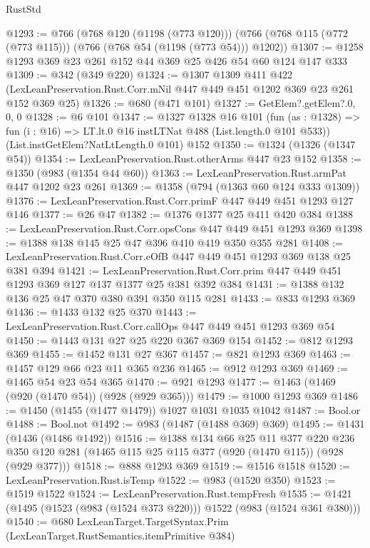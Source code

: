 \begin{lexlean}{RustStd}
\begin{coremodule}
@1293 := @766
    (@768 @120 (@1198 (@773 @120)))
    (@766 (@768 @115 (@772 (@773 @115))) (@766 (@768 @54 (@1198 (@773 @54))) @1202))
@1307 := @1258 @1293 @369 @23 @261 @152 @44 @369 @25 @426 @54 @60 @124 @147 @333
@1309 := @342 (@349 @220)
@1324 := @1307
    @1309
    @411
    @422
    (LexLeanPreservation.Rust.Corr.mNil @447 @449 @451 @1202 @369 @23 @261 @152 @369 @25)
@1326 := @680 (@471 @101)
@1327 := GetElem?.getElem?.{0, 0, 0}
@1328 := @6 @101
@1347 := @1327
    @1328
    @16
    @101
    (fun (as : @1328) => fun (i : @16) => LT.lt.{0} @16 instLTNat @488 (List.length.{0} @101 @533))
    (List.instGetElem?NatLtLength.{0} @101)
    @152
@1350 := @1324 (@1326 (@1347 @54))
@1354 := LexLeanPreservation.Rust.otherArms @447 @23 @152
@1358 := @1350 (@983 (@1354 @44 @60))
@1363 := LexLeanPreservation.Rust.armPat @447 @1202 @23 @261
@1369 := @1358 (@794 (@1363 @60 @124 @333 @1309))
@1376 := LexLeanPreservation.Rust.Corr.primF @447 @449 @451 @1293 @127 @146
@1377 := @26 @47
@1382 := @1376 @1377 @25 @411 @420 @384
@1388 := LexLeanPreservation.Rust.Corr.opsCons @447 @449 @451 @1293 @369
@1398 := @1388 @138 @145 @25 @47 @396 @410 @419 @350 @355 @281
@1408 := LexLeanPreservation.Rust.Corr.eOfB @447 @449 @451 @1293 @369 @138 @25 @381 @394
@1421 := LexLeanPreservation.Rust.Corr.prim
    @447
    @449
    @451
    @1293
    @369
    @127
    @137
    @1377
    @25
    @381
    @392
    @384
@1431 := @1388 @132 @136 @25 @47 @370 @380 @391 @350 @115 @281
@1433 := @833 @1293 @369
@1436 := @1433 @132 @25 @370
@1443 := LexLeanPreservation.Rust.Corr.callOps @447 @449 @451 @1293 @369 @54
@1450 := @1443 @131 @27 @25 @220 @367 @369 @154
@1452 := @812 @1293 @369
@1455 := @1452 @131 @27 @367
@1457 := @821 @1293 @369
@1463 := @1457 @129 @66 @23 @11 @365 @236
@1465 := @912 @1293 @369
@1469 := @1465 @54 @23 @54 @365
@1470 := @921 @1293
@1477 := @1463 (@1469 (@920 (@1470 @54)) (@928 (@929 @365)))
@1479 := @1000 @1293 @369
@1486 := @1450 (@1455 (@1477 @1479)) @1027 @1031 @1035 @1042
@1487 := Bool.or
@1488 := Bool.not
@1492 := @983 (@1487 (@1488 @369) @369)
@1495 := @1431 (@1436 (@1486 @1492))
@1516 := @1388
    @134
    @66
    @25
    @11
    @377
    @220
    @236
    @350
    @120
    @281
    (@1465 @115 @25 @115 @377 (@920 (@1470 @115)) (@928 (@929 @377)))
@1518 := @888 @1293 @369
@1519 := @1516 @1518
@1520 := LexLeanPreservation.Rust.isTemp
@1522 := @983 (@1520 @350)
@1523 := @1519 @1522
@1524 := LexLeanPreservation.Rust.tempFresh
@1535 := @1421 (@1495 (@1523 (@983 (@1524 @373 @220))) @1522 (@983 (@1524 @361 @380)))
@1540 := @680 LexLeanTarget.TargetSyntax.Prim (LexLeanTarget.RustSemantics.itemPrimitive @384)

\end{coremodule}
\end{lexlean}
